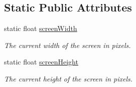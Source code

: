 \subsection*{Static Public Attributes}
\begin{DoxyCompactItemize}
\item 
static float \hyperlink{class_environment_a23b1cc781b81d7e10a8b38dbafa8471e}{screen\+Width}\hypertarget{class_environment_a23b1cc781b81d7e10a8b38dbafa8471e}{}\label{class_environment_a23b1cc781b81d7e10a8b38dbafa8471e}

\begin{DoxyCompactList}\small\item\em The current width of the screen in pixels. \end{DoxyCompactList}\item 
static float \hyperlink{class_environment_ad3e8f72de463018ecf3ccfabe3368d09}{screen\+Height}\hypertarget{class_environment_ad3e8f72de463018ecf3ccfabe3368d09}{}\label{class_environment_ad3e8f72de463018ecf3ccfabe3368d09}

\begin{DoxyCompactList}\small\item\em The current height of the screen in pixels. \end{DoxyCompactList}\end{DoxyCompactItemize}
